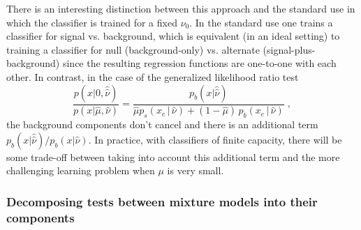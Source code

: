 \documentclass[12pt]{article}
\numberwithin{equation}{section}
\theoremstyle{plain}
\begin{document}
There is an interesting distinction between this approach and the standard use
in which the classifier is trained for a fixed $\nu_0$. In the standard use one
trains a classifier for signal vs. background, which is equivalent (in an ideal
setting) to training a classifier for  null (background-only) vs. alternate
(signal-plus-background) since the resulting regression functions are one-to-one
with each other. In contrast, in the case of the generalized likelihood ratio
test
\begin{equation}\label{eq:hep_improved}
 \frac{p(x| 0, \hat{\hat{ \nu}})}{p(x|\hat \mu, \hat\nu)} =  \frac{p_b(x| \hat{\hat{ \nu}})}{ \hat \mu p_s( x_e \, |\,  \hat\nu)  + (1- \hat \mu )\, p_b( x_e \,|\, \hat \nu)} \; ,
\end{equation}
the background components don't cancel and there is an additional term $p_b(x|
\hat{\hat{ \nu}})/p_b(x| {\hat{ \nu}})$. In practice, with classifiers of finite
capacity, there will be some trade-off between taking into account this
additional term and the more challenging learning problem when $\mu$ is very
small.

\subsubsection{Decomposing tests between mixture models into their components}
\end{document}
